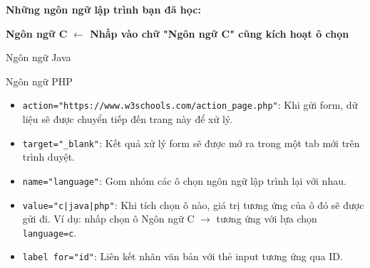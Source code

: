 \documentclass[11pt,oneside]{book}
\newcommand{\codeinline}[1]{\textcolor{accentOrange}{\texttt{#1}}}
\begin{document}
\begin{browserWindow}
\sffamily\small
\textbf{Những ngôn ngữ lập trình bạn đã học:} \\[5pt]
 \; \textbf{Ngôn ngữ C} \quad \textcolor{primaryBlue}{\small\textbf{$\leftarrow$ Nhấp vào chữ "Ngôn ngữ C" cũng kích hoạt ô chọn}} \\[4pt]
 \; Ngôn ngữ Java \\[4pt]
 \; Ngôn ngữ PHP \\[8pt]
\end{browserWindow}

\begin{noteBox}
\begin{itemize}[leftmargin=1.5em, itemsep=2pt, parsep=0pt]
    \item \codeinline{action="https://www.w3schools.com/action\_page.php"}: Khi gửi form, dữ liệu sẽ được chuyển tiếp đến trang này để xử lý.
    \item \codeinline{target="\_blank"}: Kết quả xử lý form sẽ được mở ra trong một tab mới trên trình duyệt.
    \item \codeinline{name="language"}: Gom nhóm các ô chọn ngôn ngữ lập trình lại với nhau.
    \item \codeinline{value="c|java|php"}: Khi tích chọn ô nào, giá trị tương ứng của ô đó sẽ được gửi đi. Ví dụ: nhấp chọn ô Ngôn ngữ C $\rightarrow$ tương ứng với lựa chọn \codeinline{language=c}.
    \item \codeinline{label for="id"}: Liên kết nhãn văn bản với thẻ input tương ứng qua ID.
\end{itemize}
\end{noteBox}
\end{document}
